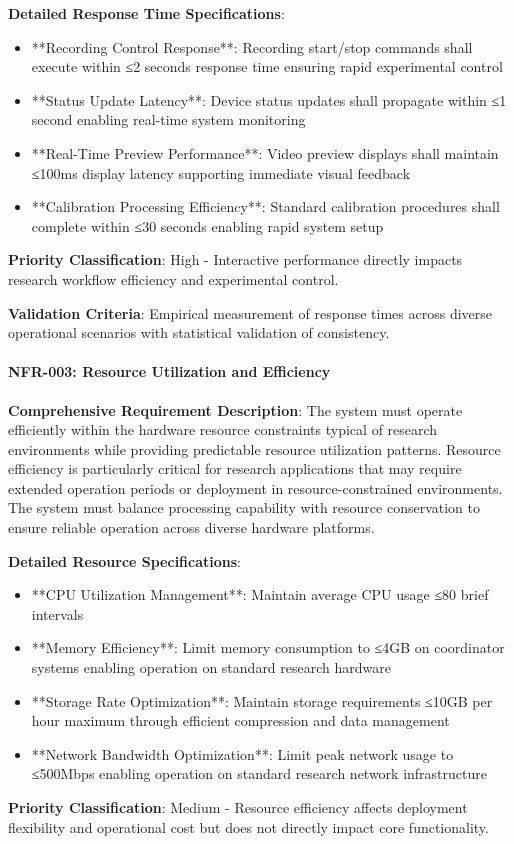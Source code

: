 \documentclass[11pt,a4paper]{report}
\begin{document}
\textbf{Detailed Response Time Specifications}:

\begin{itemize}
\item **Recording Control Response**: Recording start/stop commands shall execute within ≤2 seconds response time ensuring
  rapid experimental control
\item **Status Update Latency**: Device status updates shall propagate within ≤1 second enabling real-time system monitoring
\item **Real-Time Preview Performance**: Video preview displays shall maintain ≤100ms display latency supporting immediate
  visual feedback
\item **Calibration Processing Efficiency**: Standard calibration procedures shall complete within ≤30 seconds enabling
  rapid system setup

\end{itemize}
\textbf{Priority Classification}: High - Interactive performance directly impacts research workflow efficiency and
experimental control.

\textbf{Validation Criteria}: Empirical measurement of response times across diverse operational scenarios with statistical
validation of consistency.

\paragraph{NFR-003: Resource Utilization and Efficiency}

\textbf{Comprehensive Requirement Description}: The system must operate efficiently within the hardware resource constraints
typical of research environments while providing predictable resource utilization patterns. Resource efficiency is
particularly critical for research applications that may require extended operation periods or deployment in
resource-constrained environments. The system must balance processing capability with resource conservation to ensure
reliable operation across diverse hardware platforms.

\textbf{Detailed Resource Specifications}:

\begin{itemize}
\item **CPU Utilization Management**: Maintain average CPU usage ≤80%
  brief intervals
\item **Memory Efficiency**: Limit memory consumption to ≤4GB on coordinator systems enabling operation on standard research
  hardware
\item **Storage Rate Optimization**: Maintain storage requirements ≤10GB per hour maximum through efficient compression and
  data management
\item **Network Bandwidth Optimization**: Limit peak network usage to ≤500Mbps enabling operation on standard research
  network infrastructure

\end{itemize}
\textbf{Priority Classification}: Medium - Resource efficiency affects deployment flexibility and operational cost but does
not directly impact core functionality.
\end{document}
